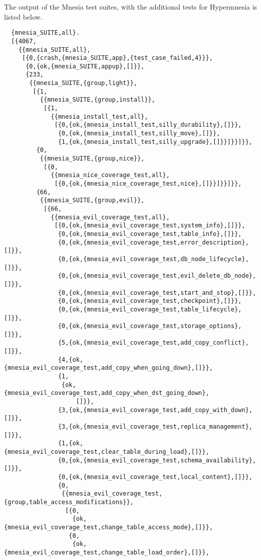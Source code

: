 The output of the Mnesia test suites, with the additional tests for Hypermnesia
is listed below.


\begin{verbatim}
  {mnesia_SUITE,all}.
  [{4067,
    {{mnesia_SUITE,all},
     [{0,{crash,{mnesia_SUITE,app},{test_case_failed,4}}},
      {0,{ok,{mnesia_SUITE,appup},[]}},
      {233,
       {{mnesia_SUITE,{group,light}},
        [{1,
          {{mnesia_SUITE,{group,install}},
           [{1,
             {{mnesia_install_test,all},
              [{0,{ok,{mnesia_install_test,silly_durability},[]}},
               {0,{ok,{mnesia_install_test,silly_move},[]}},
               {1,{ok,{mnesia_install_test,silly_upgrade},[]}}]}}]}},
         {0,
          {{mnesia_SUITE,{group,nice}},
           [{0,
             {{mnesia_nice_coverage_test,all},
              [{0,{ok,{mnesia_nice_coverage_test,nice},[]}}]}}]}},
         {66,
          {{mnesia_SUITE,{group,evil}},
           [{66,
             {{mnesia_evil_coverage_test,all},
              [{0,{ok,{mnesia_evil_coverage_test,system_info},[]}},
               {0,{ok,{mnesia_evil_coverage_test,table_info},[]}},
               {0,{ok,{mnesia_evil_coverage_test,error_description},[]}},
               {0,{ok,{mnesia_evil_coverage_test,db_node_lifecycle},[]}},
               {0,{ok,{mnesia_evil_coverage_test,evil_delete_db_node},[]}},
               {0,{ok,{mnesia_evil_coverage_test,start_and_stop},[]}},
               {0,{ok,{mnesia_evil_coverage_test,checkpoint},[]}},
               {0,{ok,{mnesia_evil_coverage_test,table_lifecycle},[]}},
               {0,{ok,{mnesia_evil_coverage_test,storage_options},[]}},
               {5,{ok,{mnesia_evil_coverage_test,add_copy_conflict},[]}},
               {4,{ok,{mnesia_evil_coverage_test,add_copy_when_going_down},[]}},
               {1,
                {ok,{mnesia_evil_coverage_test,add_copy_when_dst_going_down},
                    []}},
               {3,{ok,{mnesia_evil_coverage_test,add_copy_with_down},[]}},
               {3,{ok,{mnesia_evil_coverage_test,replica_management},[]}},
               {1,{ok,{mnesia_evil_coverage_test,clear_table_during_load},[]}},
               {0,{ok,{mnesia_evil_coverage_test,schema_availability},[]}},
               {0,{ok,{mnesia_evil_coverage_test,local_content},[]}},
               {0,
                {{mnesia_evil_coverage_test,{group,table_access_modifications}},
                 [{0,
                   {ok,{mnesia_evil_coverage_test,change_table_access_mode},[]}},
                  {0,
                   {ok,{mnesia_evil_coverage_test,change_table_load_order},[]}},

\end{verbatim}
